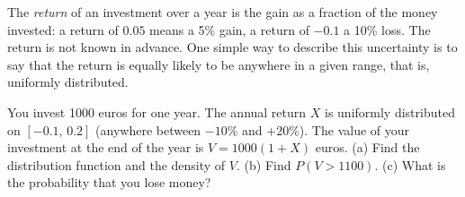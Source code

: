 
\begin{problem}
	\begin{context}
		The \emph{return} of an investment over a year is the gain as a fraction
		of the money invested: a return of $0.05$ means a 5\% gain, a return of
		$-0.1$ a 10\% loss. The return is not known in advance. One simple way
		to describe this uncertainty is to say that the return is equally likely
		to be anywhere in a given range, that is, uniformly distributed.
	\end{context}
	You invest 1000 euros for one year. The annual return $X$ is uniformly
	distributed on $[-0.1,\,0.2]$ (anywhere between $-10\%$ and $+20\%$). The
	value of your investment at the end of the year is $V=1000(1+X)$ euros.
	(a) Find the distribution function and the density of $V$.
	(b) Find $P(V>1100)$.
	(c) What is the probability that you lose money?
\end{problem}

